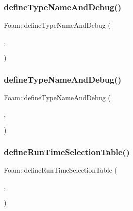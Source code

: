 \mbox{\label{namespaceFoam_af35dd79f13caa320cad2aa7339c0f7a2}} 
\subsubsection{\texorpdfstring{define\+Type\+Name\+And\+Debug()}{defineTypeNameAndDebug()}\hspace{0.1cm}{\footnotesize\ttfamily [39/50]}}
{\footnotesize\ttfamily Foam\+::define\+Type\+Name\+And\+Debug (\begin{DoxyParamCaption}\item[{\hyperlink{classFoam_1_1FSPair}{F\+S\+Pair}}]{,  }\item[{0}]{ }\end{DoxyParamCaption})}

\mbox{\label{namespaceFoam_a1d8583b4359c520c61ecf9c3e8bc863d}} 
\subsubsection{\texorpdfstring{define\+Type\+Name\+And\+Debug()}{defineTypeNameAndDebug()}\hspace{0.1cm}{\footnotesize\ttfamily [40/50]}}
{\footnotesize\ttfamily Foam\+::define\+Type\+Name\+And\+Debug (\begin{DoxyParamCaption}\item[{\hyperlink{classFoam_1_1regimeMapModel}{regime\+Map\+Model}}]{,  }\item[{0}]{ }\end{DoxyParamCaption})}

\mbox{\label{namespaceFoam_a821b2e3535406de87937e11bbb0cb15f}} 
\subsubsection{\texorpdfstring{define\+Run\+Time\+Selection\+Table()}{defineRunTimeSelectionTable()}\hspace{0.1cm}{\footnotesize\ttfamily [25/28]}}
{\footnotesize\ttfamily Foam\+::define\+Run\+Time\+Selection\+Table (\begin{DoxyParamCaption}\item[{\hyperlink{classFoam_1_1regimeMapModel}{regime\+Map\+Model}}]{,  }\item[{regime\+Map\+Models}]{ }\end{DoxyParamCaption})}

